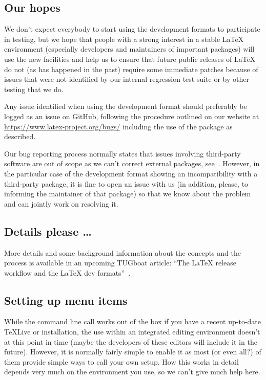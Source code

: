 \documentclass{ltnews}
\providecommand\MiKTeX{\hologo{MiKTeX}}
\providecommand\TL{\TeX{}Live}
\begin{document}
\subsection{Our hopes}

We don’t expect everybody to start using the development formats to
participate in testing, but we hope that people with a strong interest
in a stable \LaTeX{} environment (especially developers and maintainers
of important packages) will use the new facilities and help us to
ensure that future public releases of \LaTeX{} do not (as has happened in
the past) require some immediate patches because of issues that were
not identified by our internal regression test suite or by other
testing that we do.

Any issue identified when using the development format should
preferably be logged as an issue on GitHub, following the procedure
outlined on our website at \url{https://www.latex-project.org/bugs/}
including the use of the  package as described.

Our bug reporting process normally states that issues involving
third-party software are out of scope as we can’t correct external
packages, see~\cite{30:Mittelbach:TB39-1}. However, in the particular
case of the development format showing an incompatibility with a
third-party package, it is fine to open an issue with us (in addition,
please, to informing the maintainer of that package) so that we know
about the problem and can jointly work on resolving it.

\subsection{Details please \ldots}

More details and some background information about the concepts and
the process is available in an upcoming TUGboat article: \enquote{The
  \LaTeX{} release workflow and the \LaTeX{} dev
  formats}~\cite{devformat}.

\subsection{Setting up menu items}

While the command line call works out of the box if you have a recent
up-to-date \TL{} or \MiKTeX{} installation, the use within an integrated
editing environment doesn’t at this point in time (maybe the
developers of these editors will include it in the future). However,
it is normally fairly simple to enable it as most (or even all?) of
them provide simple ways to call your own setup. How this works in
detail depends very much on the environment you use, so we can’t give
much help here.
\end{document}
